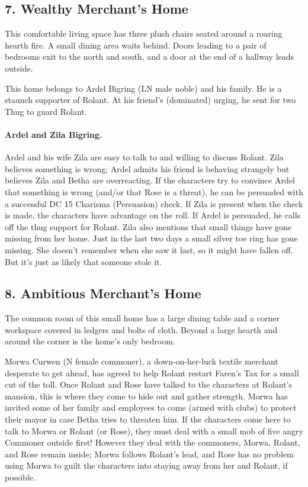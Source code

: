 \documentclass[10pt,a4paper,twoside,twocolumn,openany,bg=print,nodeprecatedcode]{dndbook}
\begin{document}
\subsection{7. Wealthy Merchant's Home}
\begin{DndReadAloud}{}
This comfortable living space has three plush chairs seated around a roaring hearth fire. A small dining area waits behind. Doors leading to a pair of bedrooms exit to the north and south, and a door at the end of a hallway leads outside.
\end{DndReadAloud}

This home belongs to Ardel Bigring (LN male noble) and his family. He is a staunch supporter of Rolant. At his friend's (dominated) urging, he sent for two Thug to guard Rolant.
\paragraph{Ardel and Zila Bigring.}
Ardel and his wife Zila are easy to talk to and willing to discuss Rolant. Zila believes something is wrong; Ardel admits his friend is behaving strangely but believes Zila and Betha are overreacting. If the characters try to convince Ardel that something is wrong (and/or that Rose is a threat), he can be persuaded with a successful DC 15 Charisma (Persuasion) check. If Zila is present when the check is made, the characters have advantage on the roll. If Ardel is persuaded, he calls off the thug support for Rolant.
Zila also mentions that small things have gone missing from her home. Just in the last two days a small silver toe ring has gone missing. She doesn't remember when she saw it last, so it might have fallen off. But it's just as likely that someone stole it.
\subsection{8. Ambitious Merchant's Home}
\begin{DndReadAloud}{}
The common room of this small home has a large dining table and a corner workspace covered in ledgers and bolts of cloth. Beyond a large hearth and around the corner is the home's only bedroom.
\end{DndReadAloud}

Morwa Curwen (N female commoner), a down-on-her-luck textile merchant desperate to get ahead, has agreed to help Rolant restart Faren's Tax for a small cut of the toll. Once Rolant and Rose have talked to the characters at Rolant's mansion, this is where they come to hide out and gather strength. Morwa has invited some of her family and employees to come (armed with clubs) to protect their mayor in case Betha tries to threaten him. If the characters come here to talk to Morwa or Rolant (or Rose), they must deal with a small mob of five angry Commoner outside first!
However they deal with the commoners, Morwa, Rolant, and Rose remain inside; Morwa follows Rolant's lead, and Rose has no problem using Morwa to guilt the characters into staying away from her and Rolant, if possible.
\end{document}
